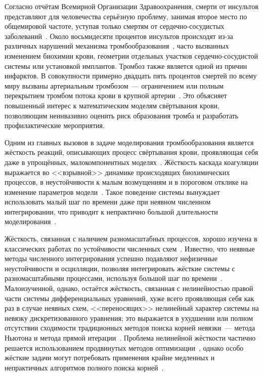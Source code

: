 \label{chapter:introduction} 

Согласно отчётам Всемирной Организации Здравоохранения,
смерти от инсультов представляют для человечества серьёзную проблему,
занимая второе место по общемировой частоте,
уступая только смертям от сердечно-сосудистых заболеваний~\cite{geoffrey2008stroke, who2020global_health_estimates}.
Около восьмидесяти процентов инсультов происходят из-за различных нарушений механизма тромбообразования~\cite{geoffrey2008stroke},
часто вызванных изменением биохимии крови,
геометрии отдельных участков сердечно-сосудистой системы
или установкой имплантов.
Тромбоз также является одной из причин инфарктов.
В совокупности примерно двадцать пять процентов смертей по всему миру вызваны артериальным тромбозом~---
ограничением или полным перекрытием тромбом потока крови в крупной артерии~\cite{jackson2011arterial_thrombosis}.
Это объясняет повышенный интерес к математическим моделям свёртывания крови,
позволяющим неинвазивно оценить риск образования тромба и разработать профилактические мероприятия.

Одним из главных вызовов в задаче моделирования тромбообразования является жёсткость реакций,
описывающих процесс свёртывания крови,
проявляющая себя даже в упрощённых, малокомпонентных моделях~\cite{bouchnita2020mathematical}.
Жёсткость каскада коагуляции выражается во <<взрывной>> динамике происходящих биохимических процессов,
в неустойчивости к малым возмущениям и в пороговом отклике на изменение параметров модели~\cite{kastrup2007threshold, shen2008threshold, butakov2022two_methods}.
Такое поведение системы вынуждает использовать малый шаг по времени даже при неявном численном интегрировании,
что приводит к непрактично большой длительности моделирования~\cite{douglas1967generalizedrk}.

Жёсткость, связанная с наличием разномасштабных процессов,
хорошо изучена в классических работах по устойчивости численных схем~\cite{auzinger1993modern, dahlquist1963special, dahlquist1975stability, liu2019study}.
Известно, что неявные методы численного интегрирования успешно подавляют нефизичные неустойчивости и осцилляции,
позволяя интегрировать жёсткие системы с разномасштабными процессами,
используя большой шаг по времени~\cite{heirer1999solvingode2}.
Малоизученной, однако, остаётся жёсткость, связанная с нелинейностью правой части системы дифференциальных уравнений,
хуже всего проявляющая себя как раз в случае неявных схем,
<<переносящих>> нелинейный характер системы на невязку дискретизованного уравнения;
это выражается в ухудшении или полном отсутствии сходимости традиционных методов поиска корней невязки~---
метода Ньютона и метода прямой итерации~\cite{lambert1991methods}.
Проблема нелинейной жёсткости частично решается использованием продвинутых
методов оптимизации~\cite{brown1985experiments, alexander1991modified, moore1994stepsize, schlenkrich2006application},
однако особо жёсткие задачи могут потребовать применения крайне медленных и непрактичных алгоритмов
полного поиска корней~\cite{farrell2016computation}.

